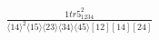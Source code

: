 \documentclass[varwidth, border=5pt]{standalone}
\begin{document}
\begin{my}
$\begin{gathered}
\scriptscriptstyle\frac{1tr5_{1234}^2}{⟨14⟩^2⟨15⟩⟨23⟩⟨34⟩⟨45⟩[12][14][24]}
\end{gathered}$
\end{my}
\end{document}
